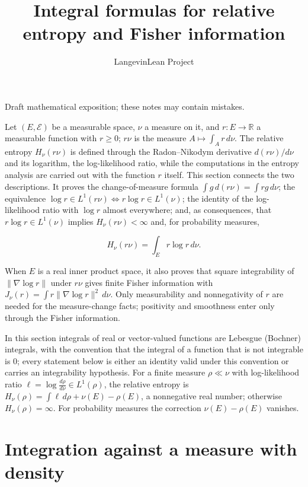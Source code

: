 \documentclass[11pt,a4paper]{article}
\title{\texorpdfstring{Integral formulas for relative entropy and Fisher information}{Integral formulas for relative entropy and Fisher information}}
\author{LangevinLean Project}
\date{}
\begin{document}
\maketitle
Draft mathematical exposition; these notes may contain mistakes.


Let \((E,\mathcal E)\) be a measurable space, \(\nu\) a measure on it, and \(r:E\to\mathbb R\) a measurable function with \(r\ge0\); \(r\nu\) is the measure \(A\mapsto\int_Ar\,d\nu\). The relative entropy \(H_\nu(r\nu)\) is defined through the Radon–Nikodym derivative \(d(r\nu)/d\nu\) and its logarithm, the log-likelihood ratio, while the computations in the entropy analysis are carried out with the function \(r\) itself. This section connects the two descriptions. It proves the change-of-measure formula \(\int g\,d(r\nu)=\int rg\,d\nu\); the equivalence \(\log r\in L^1(r\nu)\iff r\log r\in L^1(\nu)\); the identity of the log-likelihood ratio with \(\log r\) almost everywhere; and, as consequences, that \(r\log r\in L^1(\nu)\) implies \(H_\nu(r\nu)<\infty\) and, for probability measures,


\[H_\nu(r\nu)=\int_Er\log r\,d\nu.\]


When \(E\) is a real inner product space, it also proves that square integrability of \(\|\nabla\log r\|\) under \(r\nu\) gives finite Fisher information with \(J_\nu(r)=\int r\|\nabla\log r\|^2\,d\nu\). Only measurability and nonnegativity of \(r\) are needed for the measure-change facts; positivity and smoothness enter only through the Fisher information.




In this section integrals of real or vector-valued functions are Lebesgue (Bochner) integrals, with the convention that the integral of a function that is not integrable is \(0\); every statement below is either an identity valid under this convention or carries an integrability hypothesis. For a finite measure \(\rho\ll\nu\) with log-likelihood ratio \(\ell=\log\frac{d\rho}{d\nu}\in L^1(\rho)\), the relative entropy is \(H_\nu(\rho)=\int\ell\,d\rho+\nu(E)-\rho(E)\), a nonnegative real number; otherwise \(H_\nu(\rho)=\infty\). For probability measures the correction \(\nu(E)-\rho(E)\) vanishes.


\section{\texorpdfstring{Integration against a measure with density}{Integration against a measure with density}}
\end{document}

